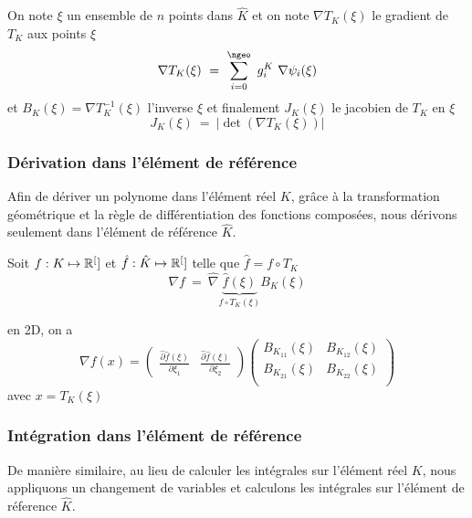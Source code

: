 On note $\xi$ un ensemble de  $n$ points dans $\hat{K}$ et on note $\nabla
T_K(\xi)$ le gradient de $T_K$ aux points $\xi$
\begin{equation}
  \label{eq:40}
  \nabla T_K( \xi )\ =\ \sum_{i=0}^{\ngeo}\ g^K_i\ \nabla \psi_i (\xi)
\end{equation}
et $B_K(\xi) = \nabla T_K^{-1}(\xi)$ l'inverse $\xi$
et finalement $J_K(\xi)$ le jacobien de $T_K$ en $\xi$
\begin{equation}
\label{eq:41}
J_K(\xi)\ =\ |\det( \nabla T_K(\xi) )|
\end{equation}

\subsubsection{Dérivation dans l'élément de référence}
\label{sec:deriv-dans-lelem}

Afin de dériver un polynome dans l'élément réel $K$, grâce à la transformation
géométrique et la règle de différentiation des fonctions composées, nous
dérivons seulement dans l'élément de référence $\hat{K}$.

Soit $f: K \mapsto \mathbb R^{[}]$ et $\hat{f}: \hat{K} \mapsto \mathbb R^{[}]$ telle
que $\hat{f} = f \circ T_K$
\begin{equation}
  \label{eq:42}
  \nabla f\ =\  \hat{\nabla} \underbrace{\hat{f}(\xi)}_{f \circ T_K(\xi)} B_K(\xi)
\end{equation}

en 2D, on a
\begin{equation}
  \label{eq:43}
  \nabla f(x) =
  \begin{pmatrix}
    \frac{\hat{\partial} \hat{f} (\xi)}{\partial \xi_1} & \frac{\hat{\partial} \hat{f} (\xi)}{\partial \xi_2}
  \end{pmatrix}
  \begin{pmatrix}
    B_{K_{11}}(\xi) & B_{K_{12}}(\xi)\\
    B_{K_{21}}(\xi) & B_{K_{22}}(\xi)\\
  \end{pmatrix}
\end{equation}
avec $x=T_K(\xi)$

\subsubsection{Intégration dans l'élément de référence}
\label{sec:integr-dans-lelem}

De manière similaire, au lieu de calculer les intégrales sur l'élément réel
$K$, nous appliquons un changement de variables et calculons les intégrales
sur l'élément de réference $\hat{K}$.

